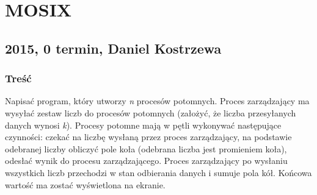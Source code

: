 \newpage
\section{MOSIX}
	\subsection{2015, 0 termin, Daniel Kostrzewa}
		\subsubsection{Treść}
			Napisać program, który utworzy \textit{n} procesów potomnych. Proces zarządzający ma wysyłać zestaw liczb do procesów potomnych (założyć, że liczba przesyłanych danych wynosi \textit{k}).
			Procesy potomne mają w pętli wykonywać następujące czynności: czekać na liczbę wysłaną przez proces zarządzający, na podstawie odebranej liczby obliczyć pole koła (odebrana liczba jest promieniem koła), odesłać wynik do procesu zarządzającego.
			Proces zarządzający po wysłaniu wszystkich liczb przechodzi w stan odbierania danych i sumuje pola kół. Końcowa wartość ma zostać wyświetlona na ekranie.

